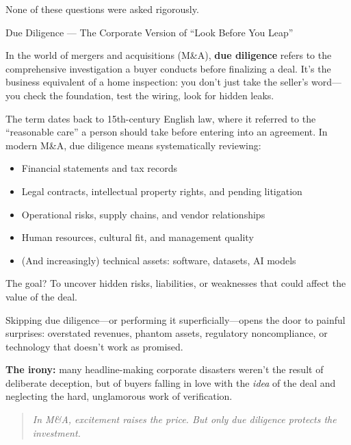 None of these questions were asked rigorously.

\begin{HistoricalSidebar}{Due Diligence --- The Corporate Version of ``Look Before You Leap''}

    In the world of mergers and acquisitions (M\&A), \textbf{due diligence} refers to the comprehensive investigation a buyer conducts before finalizing a deal.  
    It’s the business equivalent of a home inspection:  
    you don’t just take the seller’s word—you check the foundation, test the wiring, look for hidden leaks.
    
    \medskip
    
    The term dates back to 15th-century English law, where it referred to the ``reasonable care'' a person should take before entering into an agreement.  
    In modern M\&A, due diligence means systematically reviewing:

    \medskip
    
    \begin{itemize}
        \item Financial statements and tax records
        \item Legal contracts, intellectual property rights, and pending litigation
        \item Operational risks, supply chains, and vendor relationships
        \item Human resources, cultural fit, and management quality
        \item (And increasingly) technical assets: software, datasets, AI models
    \end{itemize}
    
    \medskip
    
    The goal? To uncover hidden risks, liabilities, or weaknesses that could affect the value of the deal.
    
    \medskip
    
    Skipping due diligence—or performing it superficially—opens the door to painful surprises:  
    overstated revenues, phantom assets, regulatory noncompliance, or technology that doesn’t work as promised.
    
    \medskip
    
    \textbf{The irony:} many headline-making corporate disasters weren’t the result of deliberate deception, but of buyers falling in love with the \textit{idea} of the deal and neglecting the hard, unglamorous work of verification.
    
    \medskip
    
    \begin{quote}
    \textit{In M\&A, excitement raises the price.  
    But only due diligence protects the investment.}
    \end{quote}
    
\end{HistoricalSidebar}

